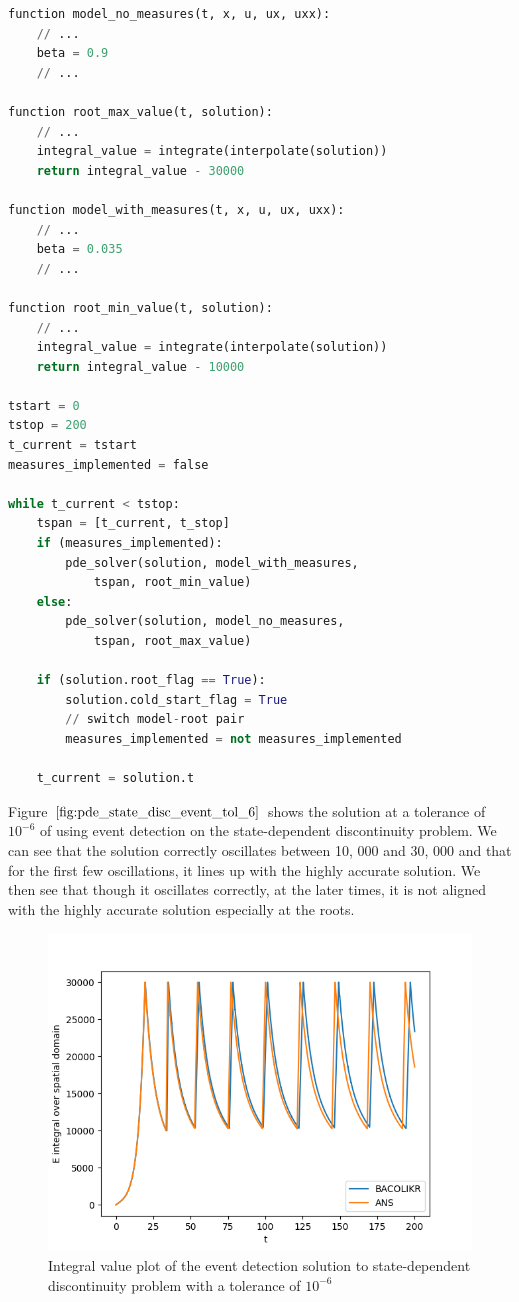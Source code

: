 \documentclass{article}
\begin{document}
\begin{minipage}{\linewidth}
\begin{lstlisting}[language=Python]
function model_no_measures(t, x, u, ux, uxx):
	// ...
	beta = 0.9
	// ...
	
function root_max_value(t, solution):
	// ...
	integral_value = integrate(interpolate(solution))
	return integral_value - 30000
	
function model_with_measures(t, x, u, ux, uxx):
	// ...
	beta = 0.035
	// ...
	
function root_min_value(t, solution):
	// ...
	integral_value = integrate(interpolate(solution))
	return integral_value - 10000

tstart = 0
tstop = 200
t_current = tstart
measures_implemented = false

while t_current < tstop:
	tspan = [t_current, t_stop]
	if (measures_implemented):
		pde_solver(solution, model_with_measures, 
			tspan, root_min_value)
	else:
		pde_solver(solution, model_no_measures, 
			tspan, root_max_value)
		
	if (solution.root_flag == True):
		solution.cold_start_flag = True
		// switch model-root pair
		measures_implemented = not measures_implemented
	
	t_current = solution.t

\end{lstlisting}
\end{minipage}

Figure $\ref{fig:pde_state_disc_event_tol_6}$ shows the solution at a tolerance of $10^{-6}$ of using event detection on the state-dependent discontinuity problem. We can see that the solution correctly oscillates between 10, 000 and 30, 000 and that for the first few oscillations, it lines up with the highly accurate solution. We then see that though it oscillates correctly, at the later times, it is not aligned with the highly accurate solution especially at the roots. 

\begin{figure}[H]
\centering
\includegraphics[width=0.7\linewidth]{./figures/pde_state_disc_event_tol_6}
\caption{Integral value plot of the event detection solution to state-dependent discontinuity problem with a tolerance of $10^{-6}$}
\label{fig:pde_state_disc_event_tol_6}
\end{figure}
\end{document}
